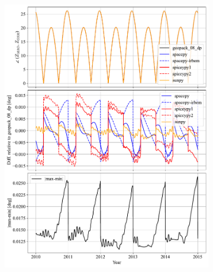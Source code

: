 \documentclass[draft]{agujournal2019}
\begin{document}
\begin{figure}[htb]
\begin{subfigure}[b]{0.49\textwidth}
         \includegraphics[width=\textwidth]{code/figures/angles/delta=1days_20100101-20150101/MAG_GSM.pdf}
     \end{subfigure}
     \caption{}
     \label{fig:angles}
\end{figure}

\clearpage
\end{document}
